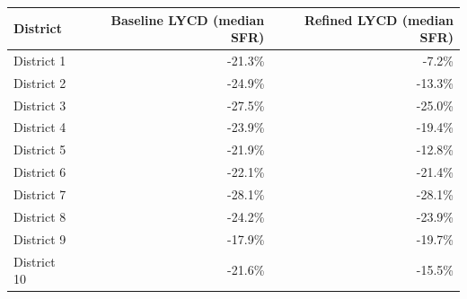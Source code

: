 \begin{tabularx}{\linewidth}{@{} Xrr @{}}
\toprule
District & Baseline LYCD (median SFR) & Refined LYCD (median SFR) \\
\midrule
District 1 & -21.3\% & -7.2\% \\
District 2 & -24.9\% & -13.3\% \\
District 3 & -27.5\% & -25.0\% \\
District 4 & -23.9\% & -19.4\% \\
District 5 & -21.9\% & -12.8\% \\
District 6 & -22.1\% & -21.4\% \\
District 7 & -28.1\% & -28.1\% \\
District 8 & -24.2\% & -23.9\% \\
District 9 & -17.9\% & -19.7\% \\
District 10 & -21.6\% & -15.5\% \\
\bottomrule
\end{tabularx}
